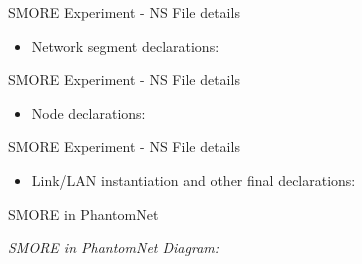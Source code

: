 \documentclass[xcolor=pdftex,dvipsnames,table]{beamer}
\begin{document}
\begin{frame}[fragile]{SMORE Experiment - NS File details}
  \begin{itemize}
    \item Network segment declarations:
  \end{itemize}
  \colorbox{SkyBlue!20}{\fontsize{2}{3}\selectfont
    \begin{minipage}{\textwidth}
      \begin{alltt}
      
      \end{alltt}
    \end{minipage}
  }
\end{frame}

\begin{frame}[fragile]{SMORE Experiment - NS File details}
  \begin{itemize}
    \item Node declarations:
  \end{itemize}
  \colorbox{SkyBlue!20}{\fontsize{2}{3}\selectfont
    \begin{minipage}{\textwidth}
      \begin{alltt}
      
      \end{alltt}
    \end{minipage}
  }
\end{frame}

\begin{frame}[fragile]{SMORE Experiment - NS File details}
  \begin{itemize}
    \item Link/LAN instantiation and other final declarations:
  \end{itemize}
  \colorbox{SkyBlue!20}{\fontsize{2}{3}\selectfont
    \begin{minipage}{\textwidth}
      \begin{alltt}
      
      \end{alltt}
    \end{minipage}
  }
\end{frame}

\begin{frame}{SMORE in PhantomNet}
  \centerline{\emph{SMORE in PhantomNet Diagram:}}
  \vspace{0.1in}
\end{frame}
\end{document}
